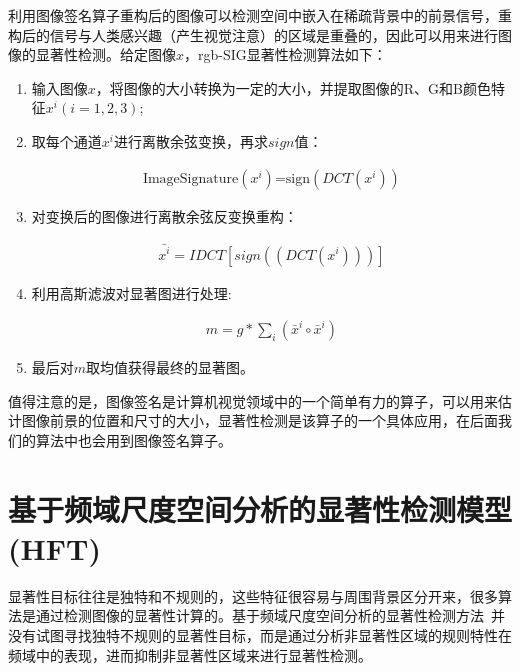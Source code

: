 利用图像签名算子重构后的图像可以检测空间中嵌入在稀疏背景中的前景信号，重构后的信号与人类感兴趣（产生视觉注意）的区域是重叠的，因此可以用来进行图像的显著性检测。给定图像$x$，rgb-SIG显著性检测算法如下：
\begin{enumerate}
\item 输入图像$x$，将图像的大小转换为一定的大小，并提取图像的R、G和B颜色特征$x^{i} (i=1,2,3)$;
\item 取每个通道$x^{i}$进行离散余弦变换，再求$sign$值：
\begin{linenomath}
\begin{align}
\textrm{ImageSignature$(x^{i})$=sign$(DCT(x^{i}))$}
\label{式3_29}
\end{align}
\end{linenomath}
\item 对变换后的图像进行离散余弦反变换重构：
\begin{linenomath}
\begin{align}
\bar{x^{i}}=IDCT[sign((DCT(x^{i})))]
\label{式3_30}
\end{align}
\end{linenomath}
\item 利用高斯滤波对显著图进行处理:
\begin{linenomath}
\begin{align}
m=g\ast\sum_{i}(\bar{x}^{i}\circ\bar{x}^{i})
\label{式3_31}
\end{align}
\end{linenomath}
\item 最后对$m$取均值获得最终的显著图。
\end{enumerate}

值得注意的是，图像签名是计算机视觉领域中的一个简单有力的算子，可以用来估计图像前景的位置和尺寸的大小，显著性检测是该算子的一个具体应用，在后面我们的算法中也会用到图像签名算子。

\section{基于频域尺度空间分析的显著性检测模型(HFT)}
\label{3_6}

显著性目标往往是独特和不规则的，这些特征很容易与周围背景区分开来，很多算法是通过检测图像的显著性计算的。基于频域尺度空间分析的显著性检测方法~\cite{LiJianTPAMI2013Scale}并没有试图寻找独特不规则的显著性目标，而是通过分析非显著性区域的规则特性在频域中的表现，进而抑制非显著性区域来进行显著性检测。

